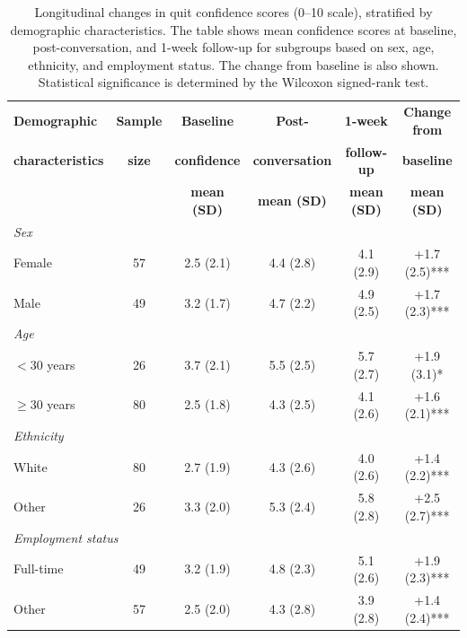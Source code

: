 \begin{table}[ht!]
	\centering
	\small
	\renewcommand{\arraystretch}{1.1}
	\begin{tabular*}{\linewidth}{@{\extracolsep{\fill}}lccccc@{}}
		\toprule
		\textbf{Demographic} & \textbf{Sample} & \textbf{Baseline} & \textbf{Post-} & \textbf{1-week} & \textbf{Change from} \\
		\textbf{characteristics} & \textbf{size} & \textbf{confidence} & \textbf{conversation} & \textbf{follow-up} & \textbf{baseline} \\
		& & \textbf{mean (SD)} & \textbf{mean (SD)} & \textbf{mean (SD)} & \textbf{mean (SD)} \\
		\midrule
		\multicolumn{6}{l}{\textit{Sex}} \\
		\quad Female & 57 & 2.5 (2.1) & 4.4 (2.8) & 4.1 (2.9) & +1.7 (2.5)*** \\
		\quad Male & 49 & 3.2 (1.7) & 4.7 (2.2) & 4.9 (2.5) & +1.7 (2.3)*** \\
		\midrule
		\multicolumn{6}{l}{\textit{Age}} \\
		\quad $<30$ years & 26 & 3.7 (2.1) & 5.5 (2.5) & 5.7 (2.7) & +1.9 (3.1)* \\
		\quad $\geq30$ years & 80 & 2.5 (1.8) & 4.3 (2.5) & 4.1 (2.6) & +1.6 (2.1)*** \\
		\midrule
		\multicolumn{6}{l}{\textit{Ethnicity}} \\
		\quad White & 80 & 2.7 (1.9) & 4.3 (2.6) & 4.0 (2.6) & +1.4 (2.2)*** \\
		\quad Other & 26 & 3.3 (2.0) & 5.3 (2.4) & 5.8 (2.8) & +2.5 (2.7)*** \\
		\midrule
		\multicolumn{6}{l}{\textit{Employment status}} \\
		\quad Full-time & 49 & 3.2 (1.9) & 4.8 (2.3) & 5.1 (2.6) & +1.9 (2.3)*** \\
		\quad Other & 57 & 2.5 (2.0) & 4.3 (2.8) & 3.9 (2.8) & +1.4 (2.4)*** \\
		\bottomrule
	\end{tabular*}
	\caption[Confidence Changes by Demographics]{Longitudinal changes in quit confidence scores (0--10 scale), stratified by demographic characteristics. The table shows mean confidence scores at baseline, post-conversation, and 1-week follow-up for subgroups based on sex, age, ethnicity, and employment status. The change from baseline is also shown. Statistical significance is determined by the Wilcoxon signed-rank test.}
	\label{table:demographics_wise_conf}
\end{table}

